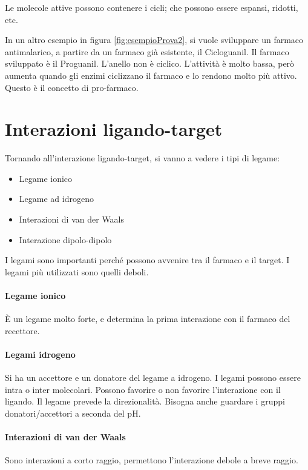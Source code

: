 Le molecole attive possono contenere i cicli; che possono essere
espansi, ridotti, etc.


In un altro esempio in figura \ref{fig:esempioProva2}, si vuole sviluppare un farmaco antimalarico, a partire da un farmaco già esistente, il Cicloguanil. Il farmaco sviluppato è il Proguanil.
L'anello non è ciclico. L'attività è molto bassa, però aumenta quando
gli enzimi ciclizzano il farmaco e lo rendono molto più attivo. Questo è
il concetto di pro-farmaco.

\section{Interazioni ligando-target}

Tornando all'interazione ligando-target, si vanno a vedere i tipi di
legame:
\begin{itemize}
  \item Legame ionico
  \item Legame ad idrogeno
  \item Interazioni di van der Waals
  \item Interazione dipolo-dipolo
\end{itemize}

I legami sono importanti perché possono avvenire tra il farmaco e il
target. I legami più utilizzati sono quelli deboli.

\paragraph{Legame ionico}
È un legame molto forte, e determina la prima interazione con il farmaco
del recettore.

\paragraph{Legami idrogeno}
Si ha un accettore e un donatore del legame a idrogeno. I legami possono
essere intra o inter molecolari. Possono favorire o non favorire
l'interazione con il ligando. Il legame prevede la direzionalità.
Bisogna anche guardare i gruppi donatori/accettori a seconda del pH.

\paragraph{Interazioni di van der Waals}
Sono interazioni a corto raggio, permettono l'interazione debole a
breve raggio.

